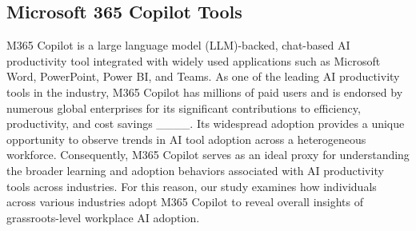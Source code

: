 


\subsection{Microsoft 365 Copilot Tools}
M365 Copilot is a large language model (LLM)-backed, chat-based AI productivity tool integrated with widely used applications such as Microsoft Word, PowerPoint, Power BI, and Teams. As one of the leading AI productivity tools in the industry, M365 Copilot has millions of paid users and is endorsed by numerous global enterprises for its significant contributions to efficiency, productivity, and cost savings ____. Its widespread adoption provides a unique opportunity to observe trends in AI tool adoption across a heterogeneous workforce. Consequently, M365 Copilot serves as an ideal proxy for understanding the broader learning and adoption behaviors associated with AI productivity tools across industries. For this reason, our study examines how individuals across various industries adopt M365 Copilot to reveal overall insights of grassroots-level workplace AI adoption.